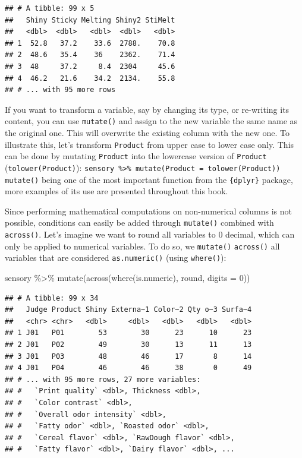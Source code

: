 \documentclass[
]{krantz}
\makeatletter
\newenvironment{Shaded}{\begin{snugshade}}{\end{snugshade}}
\newcommand{\AttributeTok}[1]{\textcolor[rgb]{0.61,0.61,0.61}{#1}}
\newcommand{\DecValTok}[1]{\textcolor[rgb]{0.06,0.06,0.06}{#1}}
\newcommand{\FunctionTok}[1]{\textcolor[rgb]{0,0,0}{#1}}
\newcommand{\NormalTok}[1]{#1}
\newcommand{\SpecialCharTok}[1]{\textcolor[rgb]{0,0,0}{#1}}
\renewenvironment{quote}{\begin{VF}}{\end{VF}}
\newenvironment{kframe}{%
\medskip{}
\setlength{\fboxsep}{.8em}
 \def\at@end@of@kframe{}%
 \ifinner\ifhmode%
  \def\at@end@of@kframe{\end{minipage}}%
  \begin{minipage}{\columnwidth}%
 \fi\fi%
 \def\FrameCommand##1{\hskip\@totalleftmargin \hskip-\fboxsep
 \colorbox{shadecolor}{##1}\hskip-\fboxsep
     \hskip-\linewidth \hskip-\@totalleftmargin \hskip\columnwidth}%
 \MakeFramed {\advance\hsize-\width
   \@totalleftmargin\z@ \linewidth\hsize
   \@setminipage}}%
 {\par\unskip\endMakeFramed%
 \at@end@of@kframe}
\renewenvironment{Shaded}{\begin{kframe}}{\end{kframe}}
\makeatother
\begin{document}
\begin{verbatim}
## # A tibble: 99 x 5
##   Shiny Sticky Melting Shiny2 StiMelt
##   <dbl>  <dbl>   <dbl>  <dbl>   <dbl>
## 1  52.8   37.2    33.6  2788.    70.8
## 2  48.6   35.4    36    2362.    71.4
## 3  48     37.2     8.4  2304     45.6
## 4  46.2   21.6    34.2  2134.    55.8
## # ... with 95 more rows
\end{verbatim}

\begin{quote}
If you want to transform a variable, say by changing its type, or re-writing its content, you can use \texttt{mutate()} and assign to the new variable the same name as the original one. This will overwrite the existing column with the new one. To illustrate this, let's transform \texttt{Product} from upper case to lower case only. This can be done by mutating \texttt{Product} into the lowercase version of \texttt{Product} (\texttt{tolower(Product)}):
\texttt{sensory\ \%\textgreater{}\%\ mutate(Product\ =\ tolower(Product))}
\texttt{mutate()} being one of the most important function from the \texttt{\{dplyr\}} package, more examples of its use are presented throughout this book.
\end{quote}

Since performing mathematical computations on non-numerical columns is not possible, conditions can easily be added through \texttt{mutate()} combined with \texttt{across()}. Let's imagine we want to round all variables to 0 decimal, which can only be applied to numerical variables.
To do so, we \texttt{mutate()} \texttt{across()} all variables that are considered \texttt{as.numeric()} (using \texttt{where()}):

\begin{Shaded}
\begin{Highlighting}[]
\NormalTok{sensory }\SpecialCharTok{\%\textgreater{}\%}
  \FunctionTok{mutate}\NormalTok{(}\FunctionTok{across}\NormalTok{(}\FunctionTok{where}\NormalTok{(is.numeric), round, }\AttributeTok{digits =} \DecValTok{0}\NormalTok{))}
\end{Highlighting}
\end{Shaded}

\begin{verbatim}
## # A tibble: 99 x 34
##   Judge Product Shiny Externa~1 Color~2 Qty o~3 Surfa~4
##   <chr> <chr>   <dbl>     <dbl>   <dbl>   <dbl>   <dbl>
## 1 J01   P01        53        30      23      10      23
## 2 J01   P02        49        30      13      11      13
## 3 J01   P03        48        46      17       8      14
## 4 J01   P04        46        46      38       0      49
## # ... with 95 more rows, 27 more variables:
## #   `Print quality` <dbl>, Thickness <dbl>,
## #   `Color contrast` <dbl>,
## #   `Overall odor intensity` <dbl>,
## #   `Fatty odor` <dbl>, `Roasted odor` <dbl>,
## #   `Cereal flavor` <dbl>, `RawDough flavor` <dbl>,
## #   `Fatty flavor` <dbl>, `Dairy flavor` <dbl>, ...
\end{verbatim}
\end{document}
